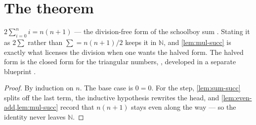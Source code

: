 \documentclass{report}
\begin{document}
\section{The theorem}

\begin{theorem}[Gauss]\label{thm:gauss}
$2\sum_{i=0}^{n} i = n(n+1)$ — the division-free form of the schoolboy sum
\cite{waltershausen1856gauss, gkp1994concrete}. Stating it as $2\sum$ rather
than $\sum = n(n+1)/2$ keeps it in $\mathbb{N}$, and \cref{lem:mul-succ} is
exactly what licenses the division when one wants the halved form. The halved
form is the closed form for the triangular numbers,
, developed in a separate
blueprint .
\end{theorem}
\begin{proof}
By induction on $n$. The base case is $0 = 0$. For the step, \cref{lem:sum-succ}
splits off the last term, the inductive hypothesis rewrites the head, and
\cref{lem:even-add,lem:mul-succ} record that $n(n+1)$ stays even along the way —
so the identity never leaves $\mathbb{N}$.
\end{proof}
\end{document}

